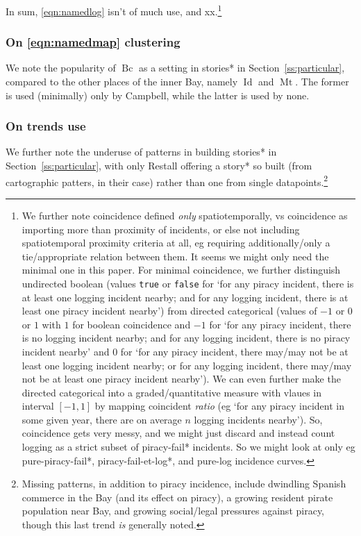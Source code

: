 \documentclass{amsart}
\newcommand{\code}[1]{\texttt{#1}} %
\newcommand{\ment}[1]{\textit{#1}} %
\DeclareMathOperator{\id}{Id} %
\DeclareMathOperator{\mt}{Mt} %
\DeclareMathOperator{\bc}{Bc} %
\theoremstyle{definition}
\theoremstyle{remark}
\begin{document}
		In sum, \ref{eqn:namedlog} isn't of much use, and xx.\footnote{We further note coincidence defined \emph{only} spatiotemporally, vs coincidence as importing more than proximity of incidents, or else not including spatiotemporal proximity criteria at all, eg requiring additionally/only a tie/appropriate relation between them. It seems we might only need the minimal one in this paper. For minimal coincidence, we further distinguish undirected boolean (values \code{true} or \code{false} for `for any piracy incident, there is at least one logging incident nearby; and for any logging incident, there is at least one piracy incident nearby') from directed categorical (values of \(-1\) or \(0\) or \(1\) with \(1\) for boolean coincidence and \(-1\) for `for any piracy incident, there is no logging incident nearby; and for any logging incident, there is no piracy incident nearby' and \(0\) for `for any piracy incident, there may/may not be at least one logging incident nearby; or for any logging incident, there may/may not be at least one piracy incident nearby'). We can even further make the directed categorical into a graded/quantitative measure with vlaues in interval \([-1,1]\) by mapping coincident \ment{ratio} (eg `for any piracy incident in some given year, there are on average \(n\) logging incidents nearby'). So, coincidence gets very messy, and we might just discard and instead count logging as a strict subset of piracy-fail* incidents. So we might look at only eg pure-piracy-fail*, piracy-fail-et-log*, and pure-log incidence curves.} %
		\subsubsection{On \ref{eqn:namedmap} clustering}
		\label{sss:onmapclusters}
		We note the popularity of \(\bc\) as a setting in stories* in Section~\ref{ss:particular}, compared to the other places of the inner Bay, namely \(\id\) and \(\mt\). The former is used (minimally) only by Campbell, while the latter is used by none.
		\subsubsection{On trends use}
		\label{sss:ontrendsuse}
		We further note the underuse of patterns in building stories* in Section~\ref{ss:particular}, with only Restall offering a story* so built (from cartographic patters, in their case) rather than one from single datapoints.\footnote{Missing patterns, in addition to piracy incidence, include dwindling Spanish commerce in the Bay (and its effect on piracy), a growing resident pirate population near Bay, and growing social/legal pressures against piracy, though this last trend \emph{is} generally noted.}
\end{document}
